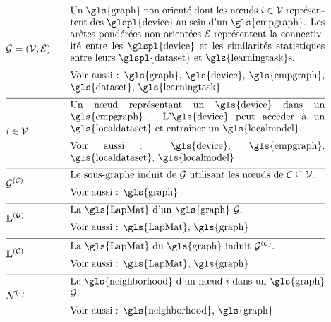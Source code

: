 \begin{align}
	&\graph = \pair{\nodes}{\edges} & \quad & \parbox{.75\textwidth}{
		Un \gls{graph} non orienté dont les nœuds $\nodeidx \in \nodes$ représentent des \glspl{device} au sein d’un \gls{empgraph}. Les arêtes pondérées non orientées $\edges$ représentent la connectivité entre les \glspl{device} et les similarités statistiques entre leurs \glspl{dataset} et \gls{learningtask}s. \\
		[2mm] Voir aussi : \gls{graph}, \gls{device}, \gls{empgraph}, \gls{dataset}, \gls{learningtask}
	} \nonumber \\[2mm] \hline \nonumber\\[-5mm]
	&\nodeidx \in \nodes & \quad & \parbox{.75\textwidth}{
		Un nœud représentant un \gls{device} dans un \gls{empgraph}. L'\gls{device} peut accéder à un \gls{localdataset} et entraîner un \gls{localmodel}. \\
		[2mm] Voir aussi : \gls{device}, \gls{empgraph}, \gls{localdataset}, \gls{localmodel}
	} \nonumber \\[2mm] \hline \nonumber\\[-5mm]
	&\indsubgraph{\graph}{\cluster} & \quad & \parbox{.75\textwidth}{
		Le sous-graphe induit de $\graph$ utilisant les nœuds de $\cluster \subseteq \nodes$. \\
		[2mm] Voir aussi : \gls{graph}
	} \nonumber \\[2mm] \hline \nonumber\\[-5mm]
	&\LapMat{\graph} & \quad & \parbox{.75\textwidth}{
		La \gls{LapMat} d’un \gls{graph} $\graph$. \\
		[2mm] Voir aussi : \gls{LapMat}, \gls{graph}
	} \nonumber \\[2mm] \hline \nonumber\\[-5mm]
	&\LapMat{\cluster} & \quad & \parbox{.75\textwidth}{
		La \gls{LapMat} du \gls{graph} induit $\indsubgraph{\graph}{\cluster}$. \\
		[2mm] Voir aussi : \gls{LapMat}, \gls{graph}
	} \nonumber \\[2mm] \hline \nonumber\\[-5mm]
	&\neighbourhood{\nodeidx} & \quad & \parbox{.75\textwidth}{
		Le \gls{neighborhood} d’un nœud $\nodeidx$ dans un \gls{graph} $\graph$. \\
		[2mm] Voir aussi : \gls{neighborhood}, \gls{graph}
	} \nonumber
\end{align}

